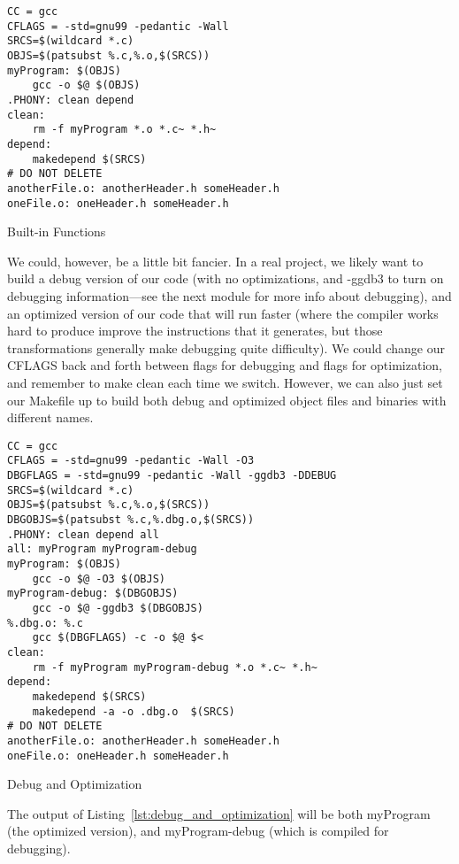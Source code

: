 \documentclass[11pt, a4paper]{article}
\begin{document}
\begin{listing}
\begin{verbatim}
CC = gcc
CFLAGS = -std=gnu99 -pedantic -Wall
SRCS=$(wildcard *.c)
OBJS=$(patsubst %.c,%.o,$(SRCS))
myProgram: $(OBJS)
    gcc -o $@ $(OBJS)
.PHONY: clean depend
clean:
    rm -f myProgram *.o *.c~ *.h~
depend:
    makedepend $(SRCS)
# DO NOT DELETE
anotherFile.o: anotherHeader.h someHeader.h
oneFile.o: oneHeader.h someHeader.h
\end{verbatim}
\caption{Built-in Functions}
\label{lst:built_in_functions}
\end{listing}




We could, however, be a little bit fancier. In a real project, we likely want to build a debug version of our code (with no optimizations, and -ggdb3 to turn on debugging information—see the next module for more info about debugging), and an optimized version of our code that will run faster (where the compiler works hard to produce improve the instructions that it generates, but those transformations generally make debugging quite difficulty). We could change our CFLAGS back and forth between flags for debugging and flags for optimization, and remember to make clean each time we switch. However, we can also just set our Makefile up to build both debug and optimized object files and binaries with different names.


\begin{listing}
\begin{verbatim}
CC = gcc
CFLAGS = -std=gnu99 -pedantic -Wall -O3
DBGFLAGS = -std=gnu99 -pedantic -Wall -ggdb3 -DDEBUG
SRCS=$(wildcard *.c)
OBJS=$(patsubst %.c,%.o,$(SRCS))
DBGOBJS=$(patsubst %.c,%.dbg.o,$(SRCS))
.PHONY: clean depend all
all: myProgram myProgram-debug
myProgram: $(OBJS)
    gcc -o $@ -O3 $(OBJS)
myProgram-debug: $(DBGOBJS)
    gcc -o $@ -ggdb3 $(DBGOBJS)
%.dbg.o: %.c
    gcc $(DBGFLAGS) -c -o $@ $<
clean:
    rm -f myProgram myProgram-debug *.o *.c~ *.h~
depend:
    makedepend $(SRCS)
    makedepend -a -o .dbg.o  $(SRCS)
# DO NOT DELETE
anotherFile.o: anotherHeader.h someHeader.h
oneFile.o: oneHeader.h someHeader.h
\end{verbatim}
\caption{Debug and Optimization}
\label{lst:debug_and_optimization}
\end{listing}


The output of Listing~\ref{lst:debug_and_optimization} will be both myProgram (the optimized version), and myProgram-debug (which is compiled for debugging).
\end{document}
